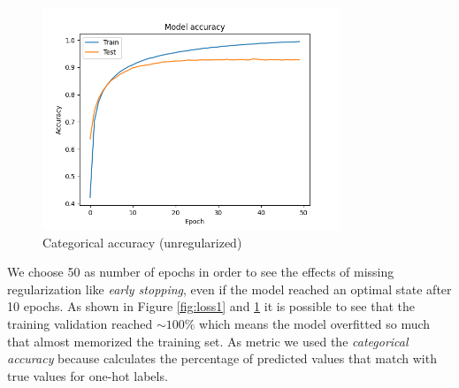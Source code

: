 \documentclass[compsoc]{IEEEtran}
\begin{document}
\begin{figure}[ht!]
\centering                                                                        
\includegraphics[width=3.5in]{../images/noreg/accuracy-sigmoid-categorical_crossentropy-Adam-50-256.png}
\captionsetup{justification=centering}                                                                                                                                   
\caption{Categorical accuracy (unregularized)}
\label{fig:acc1}                                                                                                                                          
\end{figure} 

We choose 50 as number of epochs in order to see the effects of missing regularization like \emph{early stopping}, 
even if the model reached an optimal state after 10 epochs.
As shown in Figure \ref{fig:loss1} and \ref{fig:acc1} it is possible to see that the training validation reached $\sim100\%$ which means the model
overfitted so much that almost memorized the training set. 
As metric we used the \emph{categorical accuracy} because calculates the percentage of predicted values that match with true values for one-hot labels.
\end{document}

